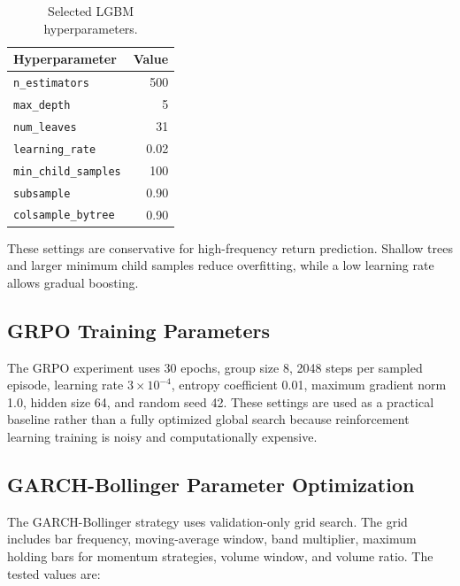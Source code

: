 \documentclass[11pt,a4paper]{article}
\begin{document}
\begin{table}[H]
    \centering
    \caption{Selected LGBM hyperparameters.}
    \label{tab:lgbm-params}
    \begin{tabular}{lr}
        \toprule
        Hyperparameter & Value \\
        \midrule
        \texttt{n\_estimators} & 500 \\
        \texttt{max\_depth} & 5 \\
        \texttt{num\_leaves} & 31 \\
        \texttt{learning\_rate} & 0.02 \\
        \texttt{min\_child\_samples} & 100 \\
        \texttt{subsample} & 0.90 \\
        \texttt{colsample\_bytree} & 0.90 \\
        \bottomrule
    \end{tabular}
\end{table}

These settings are conservative for high-frequency return prediction. Shallow trees and larger minimum child samples reduce overfitting, while a low learning rate allows gradual boosting.

\subsection{GRPO Training Parameters}

The GRPO experiment uses 30 epochs, group size 8, 2048 steps per sampled episode, learning rate $3\times 10^{-4}$, entropy coefficient 0.01, maximum gradient norm 1.0, hidden size 64, and random seed 42. These settings are used as a practical baseline rather than a fully optimized global search because reinforcement learning training is noisy and computationally expensive.

\subsection{GARCH-Bollinger Parameter Optimization}

The GARCH-Bollinger strategy uses validation-only grid search. The grid includes bar frequency, moving-average window, band multiplier, maximum holding bars for momentum strategies, volume window, and volume ratio. The tested values are:
\end{document}
